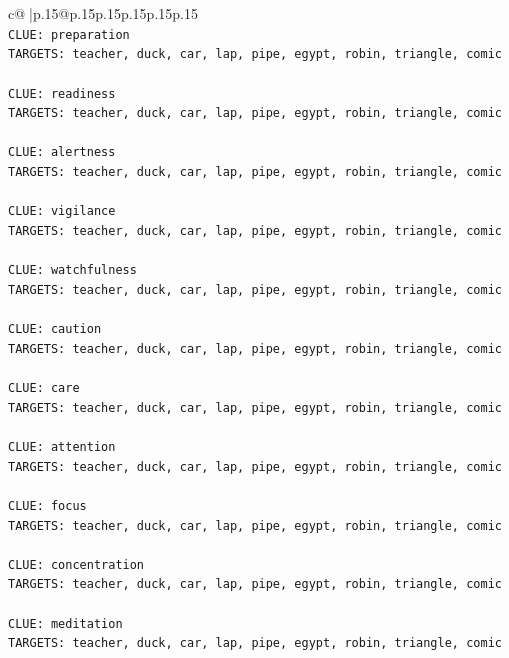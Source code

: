 \documentclass{article}
\begin{document}
{\begin{supertabular}{c@{$\;$}|p{.15\linewidth}@{}p{.15\linewidth}p{.15\linewidth}p{.15\linewidth}p{.15\linewidth}p{.15\linewidth}}
{{{\\ 
\texttt{CLUE: preparation} \\
\texttt{TARGETS: teacher, duck, car, lap, pipe, egypt, robin, triangle, comic} \\
\\ 
\texttt{CLUE: readiness} \\
\texttt{TARGETS: teacher, duck, car, lap, pipe, egypt, robin, triangle, comic} \\
\\ 
\texttt{CLUE: alertness} \\
\texttt{TARGETS: teacher, duck, car, lap, pipe, egypt, robin, triangle, comic} \\
\\ 
\texttt{CLUE: vigilance} \\
\texttt{TARGETS: teacher, duck, car, lap, pipe, egypt, robin, triangle, comic} \\
\\ 
\texttt{CLUE: watchfulness} \\
\texttt{TARGETS: teacher, duck, car, lap, pipe, egypt, robin, triangle, comic} \\
\\ 
\texttt{CLUE: caution} \\
\texttt{TARGETS: teacher, duck, car, lap, pipe, egypt, robin, triangle, comic} \\
\\ 
\texttt{CLUE: care} \\
\texttt{TARGETS: teacher, duck, car, lap, pipe, egypt, robin, triangle, comic} \\
\\ 
\texttt{CLUE: attention} \\
\texttt{TARGETS: teacher, duck, car, lap, pipe, egypt, robin, triangle, comic} \\
\\ 
\texttt{CLUE: focus} \\
\texttt{TARGETS: teacher, duck, car, lap, pipe, egypt, robin, triangle, comic} \\
\\ 
\texttt{CLUE: concentration} \\
\texttt{TARGETS: teacher, duck, car, lap, pipe, egypt, robin, triangle, comic} \\
\\ 
\texttt{CLUE: meditation} \\
\texttt{TARGETS: teacher, duck, car, lap, pipe, egypt, robin, triangle, comic} \\
\\ 
}}}
\end{supertabular}}
\end{document}

